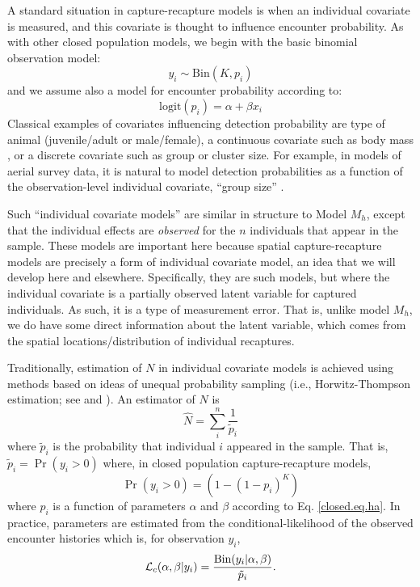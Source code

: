 A standard situation in capture-recapture models is when an individual
covariate is measured, and this covariate is thought to influence
encounter probability.  As with other closed population models, we
begin with the basic binomial observation model:
\[
y_{i} \sim \mbox{Bin}(K, p_{i})
\]
and we assume also  a model for encounter probability according to:
\begin{equation}
 \mbox{logit}(p_{i}) = \alpha + \beta x_{i}
\label{closed.eq.ha}
\end{equation}
Classical examples of covariates influencing detection probability are
type of animal (juvenile/adult or male/female), a continuous covariate
such as body mass \citep[][ch. 6]{royle_dorazio:2008}, or a
discrete covariate such as group or cluster size. For example, in
models of aerial survey data, it is natural to model detection
probabilities as a function of the observation-level individual
covariate, ``group size'' \citep{royle:2008, royle:2009,
  langtimm_etal:2011}.

Such ``individual covariate models'' are similar in structure to Model
$M_{h}$, except that the individual effects are {\it observed} for the
$n$ individuals that appear in the sample. These models are important
here because spatial capture-recapture models are precisely a form of
individual covariate model, an idea that we will develop here and
elsewhere. Specifically, they are such models, but where the
individual covariate is a partially observed latent variable for 
captured individuals. As such, it is a type of measurement error.
That is, unlike model $M_h$, we do have some direct information about the
latent variable, which comes from the spatial locations/distribution
of individual recaptures.

Traditionally, estimation of $N$ in individual covariate models is
achieved using methods based on ideas of unequal probability sampling
(i.e., Horwitz-Thompson estimation; see \citet{huggins:1989} and
\citet{alho:1990}). An estimator of $N$ is
\[
\hat{N} = \sum_{i}^{n} \frac{1}{\tilde{p}_{i}}
\]
where $\tilde{p}_{i}$ is the probability that individual $i$ appeared
in the sample.  That is, $\tilde{p}_{i} = \Pr(y_{i}>0)$
where, in closed population capture-recapture models, 
\[
\Pr(y_{i}>0) = (1- (1-p_{i})^K)
\]
where $p_{i}$ is a function of parameters $\alpha$ and $\beta$
according to
Eq. \ref{closed.eq.ha}.
In practice, parameters are estimated 
from the conditional-likelihood of the observed encounter histories
which is, for observation $y_{i}$, 
\[
{\cal L}_{c}(\alpha, \beta | y_{i}) = \frac{ \mbox{Bin}(y_{i}|\alpha,\beta) } { \tilde{p}_{i}}.
\]

